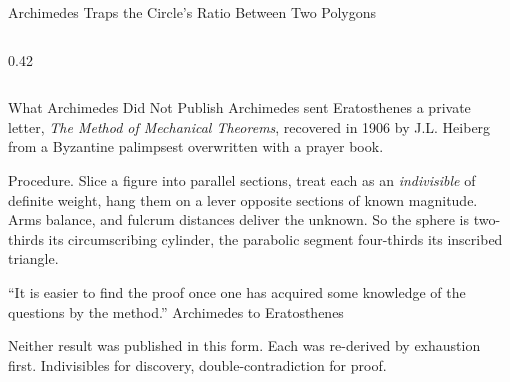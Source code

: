 \documentclass[aspectratio=169]{beamer}
\begin{document}
\begin{frame}{Archimedes Traps the Circle's Ratio Between Two Polygons}
\begin{columns}
                \begin{column}{0.42\textwidth}
                        \centering
                \end{column}
        \end{columns}
\end{frame}


\begin{frame}{What Archimedes Did Not Publish}
        Archimedes sent Eratosthenes a private letter, \emph{The
        Method of Mechanical Theorems}, recovered in 1906 by J.L.
        Heiberg from a Byzantine palimpsest overwritten with a prayer book.

        \vspace{0.1cm}
        Procedure. Slice a figure into parallel sections, treat each
        as an \emph{indivisible} of definite weight, hang them on a
        lever opposite sections of known magnitude. Arms balance,
        and fulcrum distances deliver the unknown. So the sphere is
        two-thirds its circumscribing cylinder, the parabolic
        segment four-thirds its inscribed triangle.

        \begin{shadowbox}
                ``It is easier to find the proof once one has
                acquired some knowledge of the questions by the
                method.'' \hfill Archimedes to Eratosthenes
        \end{shadowbox}

        Neither result was published in this form. Each was
        re-derived by exhaustion first. Indivisibles for discovery,
        double-contradiction for proof.
\end{frame}
\end{document}
